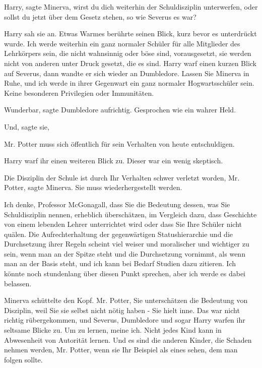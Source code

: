 \glqq Harry\grqq{}, sagte Minerva, \glqq wirst du dich weiterhin der
Schuldisziplin unterwerfen, oder sollst du jetzt über dem Gesetz stehen, so wie
Severus es war?\grqq{}

Harry sah sie an. Etwas Warmes berührte seinen Blick, kurz bevor es unterdrückt
wurde. \glqq Ich werde weiterhin ein ganz normaler Schüler für alle Mitglieder
des Lehrkörpers sein, die nicht wahnsinnig oder böse sind, vorausgesetzt, sie
werden nicht von anderen unter Druck gesetzt, die es sind.\grqq{} Harry warf
einen kurzen Blick auf Severus, dann wandte er sich wieder an Dumbledore. \glqq
Lassen Sie Minerva in Ruhe, und ich werde in ihrer Gegenwart ein ganz normaler
Hogwartsschüler sein. Keine besonderen Privilegien oder Immunitäten.\grqq{}

\glqq Wunderbar\grqq{}, sagte Dumbledore aufrichtig. \glqq Gesprochen wie ein
wahrer Held.\grqq{}

\glqq Und\grqq{}, sagte sie,

\glqq Mr. Potter muss sich öffentlich für sein Verhalten von heute
entschuldigen.\grqq{}

Harry warf ihr einen weiteren Blick zu. Dieser war ein wenig skeptisch.

\glqq Die Disziplin der Schule ist durch Ihr Verhalten schwer verletzt worden,
Mr. Potter\grqq{}, sagte Minerva. \glqq Sie muss wiederhergestellt
werden.\grqq{}

\glqq Ich denke, Professor McGonagall, dass Sie die Bedeutung dessen, was Sie
Schuldisziplin nennen, erheblich überschätzen, im Vergleich dazu, dass
Geschichte von einem lebenden Lehrer unterrichtet wird oder dass Sie Ihre
Schüler nicht quälen. Die Aufrechterhaltung der gegenwärtigen Statushierarchie
und die Durchsetzung ihrer Regeln scheint viel weiser und moralischer und
wichtiger zu sein, wenn man an der Spitze steht und die Durchsetzung vornimmt,
als wenn man an der Basis steht, und ich kann bei Bedarf Studien dazu zitieren.
Ich könnte noch stundenlang über diesen Punkt sprechen, aber ich werde es dabei
belassen.\grqq{}

Minerva schüttelte den Kopf. \glqq Mr. Potter, Sie unterschätzen die Bedeutung
von Disziplin, weil Sie sie selbst nicht nötig haben -\grqq{} Sie hielt inne.
Das war nicht richtig rübergekommen, und Severus, Dumbledore und sogar Harry
warfen ihr seltsame Blicke zu. \glqq Um zu lernen, meine ich. Nicht jedes Kind
kann in Abwesenheit von Autorität lernen. Und es sind die anderen Kinder, die
Schaden nehmen werden, Mr. Potter, wenn sie Ihr Beispiel als eines sehen, dem
man folgen sollte.\grqq{}

